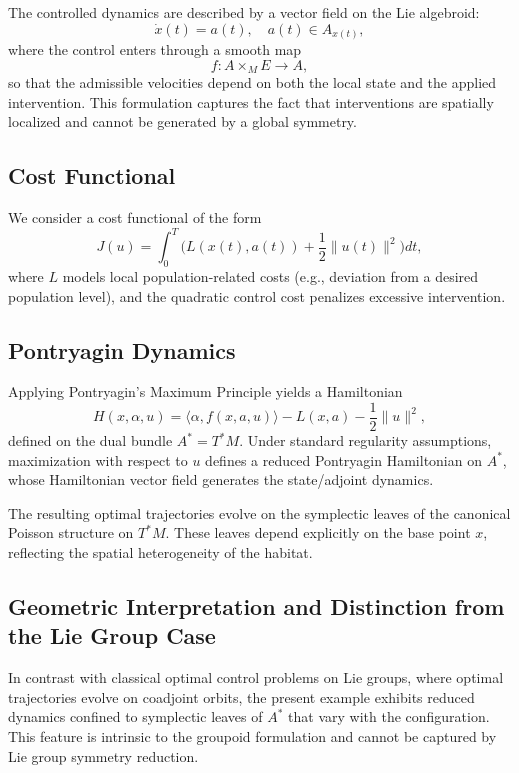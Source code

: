\documentclass{article}
\begin{document}
The controlled dynamics are described by a vector field on the Lie algebroid:
\[
\dot{x}(t) = a(t), \quad a(t) \in A_{x(t)},
\]
where the control enters through a smooth map
\[
f: A \times_M E \to A,
\]
so that the admissible velocities depend on both the local state and the applied intervention. This formulation captures the fact that interventions are spatially localized and cannot be generated by a global symmetry.

\subsection*{Cost Functional}

We consider a cost functional of the form
\[
J(u) = \int_0^T \Big( L(x(t), a(t)) + \frac{1}{2} \| u(t) \|^2 \Big) dt,
\]
where $L$ models local population-related costs (e.g., deviation from a desired population level), and the quadratic control cost penalizes excessive intervention.

\subsection*{Pontryagin Dynamics}

Applying Pontryagin's Maximum Principle yields a Hamiltonian
\[
H(x, \alpha, u) = \langle \alpha, f(x, a, u) \rangle - L(x, a) - \frac{1}{2} \| u \|^2,
\]
defined on the dual bundle $A^* = T^*M$. Under standard regularity assumptions, maximization with respect to $u$ defines a reduced Pontryagin Hamiltonian on $A^*$, whose Hamiltonian vector field generates the state/adjoint dynamics.

The resulting optimal trajectories evolve on the symplectic leaves of the canonical Poisson structure on $T^*M$. These leaves depend explicitly on the base point $x$, reflecting the spatial heterogeneity of the habitat.

\subsection*{Geometric Interpretation and Distinction from the Lie Group Case}

In contrast with classical optimal control problems on Lie groups, where optimal trajectories evolve on coadjoint orbits, the present example exhibits reduced dynamics confined to symplectic leaves of $A^*$ that vary with the configuration. This feature is intrinsic to the groupoid formulation and cannot be captured by Lie group symmetry reduction.
\end{document}
